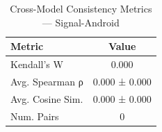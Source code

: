\begin{table}[htbp]
\centering
\caption{Cross-Model Consistency Metrics — Signal-Android}
\label{tab:exp2_consistency_Signal-Android}
\begin{tabular}{lc}
\toprule
\textbf{Metric} & \textbf{Value} \\
\midrule
Kendall's W & 0.000 \\
Avg. Spearman ρ & 0.000 ± 0.000 \\
Avg. Cosine Sim. & 0.000 ± 0.000 \\
Num. Pairs & 0 \\
\bottomrule
\end{tabular}
\end{table}